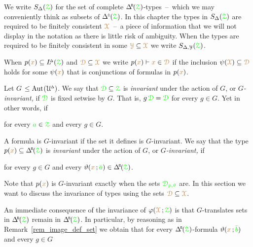 We write \emph{$S_\Delta({\color{green}\EuScript Z})$\/} for the set of complete $\BDelta(\grZ)$-types~--~which we may conveniently think as subsets of $\pmDelta(\grZ)$.
In this chapter the types in $S_\Delta({\color{green}\EuScript Z})$ are required to be finitely consistent ${\color{brown}\EuScript X}$~--~a piece of information that we will not display in the notation as there is little risk of ambiguity.
When the types are required to be finitely consistent in some ${\color{brown}\EuScript Y}\subseteq{\color{brown}\EuScript X}$ we write \emph{$S_{\Delta,\EuScript Y}({\color{green}\EuScript Z})$.}


When $p({\color{brown} x})\subseteq L\kern-.5ex^{\scriptscriptstyle\Delta}({\color{green}\EuScript Z})$ and ${{\color{brown}\EuScript D}}\subseteq{\color{brown}\EuScript X}$ we write $p({\color{brown} x})\vdash{\color{brown}x}\in{{\color{brown}\EuScript D}}$ if the inclusion $\psi({\color{brown}\EuScript X})\subseteq{{\color{brown}\EuScript D}}$ holds for some $\psi({\color{brown} x})$ that is conjunctions of formulas in $p({\color{brown} x})$.

Let \emph{$G$\/} $\le{\rm Aut\kern.15ex}(\EuScript U\kern-.2ex^{\scriptscriptstyle\Delta})$.
We say that ${\color{green}\EuScript D}\subseteq{\color{green}\EuScript Z}$ is \emph{invariant\/} under the action of $G$, or \emph{$G$-invariant,} if  ${\color{green}\EuScript D}$ is fixed setwise by $G$.
That is, $g\,{\color{green}\EuScript D}={\color{green}\EuScript D}$ for every $g\in G$.
Yet in other words, if

\hfill for every ${\color{green} a}\in{\color{green}\EuScript Z}$ and every $g\in G$.

A formula is $G$-invariant if the set it defines is $G$-invariant.
We say that the type $p({\mr x})\subseteq\BDelta(\grZ)$ is \emph{invariant\/} under the action of $G$, or \emph{$G$-invariant,} if 

\hfill for every $g\in G$ and every $\theta({\mr x}\,;{\gr\bar a})\in\BDelta(\grZ)$.

Note that $p({\color{brown} x})$ is $G$-invariant exactly when the sets ${\color{green}\EuScript D_{p,\vartheta}}$ are.
In this section we want to discuss the invariance of types using the sets ${\color{brown}\EuScript D}\subseteq{\color{brown}\EuScript X}$.

An immediate consequence of the invariance of $\varphi({\color{brown}\EuScript X}\,;{\color{green}\EuScript Z})$ is that $G$-translates sets in $\BDelta({\grZ})$ remain in $\BDelta({\grZ})$.
In particular, by reasoning as in Remark~\ref{rem_image_def_set} we obtain that for every $\BDelta({\grZ})$-formula $\vartheta({\color{brown} x}\,;{\color{green}\bar b})$ and every $g\in G$

